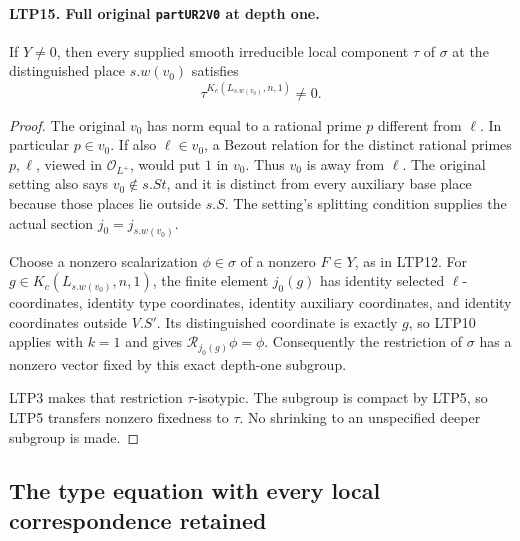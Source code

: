 \documentclass[11pt,a4paper]{article}
\numberwithin{equation}{section}
\theoremstyle{remark}\newtheorem{remark}[theorem]{Remark}
\begin{document}
\paragraph{LTP15. Full original \texttt{part\allowbreak UR2V0} at depth one.}
\label{claim:LTP15}
If \(Y\ne0\), then every supplied smooth irreducible local
component \(\tau\) of \(\sigma\) at the distinguished place
\(s.w(v_0)\) satisfies
\[
                     \tau^{K_c(L_{s.w(v_0)},n,1)}\ne0 .
\]
\begin{proof}
The original \(v_0\) has norm equal to a rational prime \(p\)
different from \(\ell\).  In particular \(p\in v_0\).
If also \(\ell\in v_0\), a Bezout relation for the distinct
rational primes \(p,\ell\), viewed in \(\mathcal O_{L^+}\),
would put \(1\) in \(v_0\).  Thus \(v_0\) is away from \(\ell\).
The original setting also says \(v_0\notin s.St\), and it is
distinct from every auxiliary base place because those places
lie outside \(s.S\).  The setting's splitting condition supplies
the actual section \(j_0=j_{s.w(v_0)}\).

Choose a nonzero scalarization \(\phi\in\sigma\) of a nonzero
\(F\in Y\), as in LTP12.  For
\(g\in K_c(L_{s.w(v_0)},n,1)\), the finite element \(j_0(g)\)
has identity selected \(\ell\)-coordinates, identity type
coordinates, identity auxiliary coordinates, and identity
coordinates outside \(V.S'\).  Its distinguished coordinate is
exactly \(g\), so LTP10 applies with \(k=1\) and gives
\(\mathscr R_{j_0(g)}\phi=\phi\).  Consequently the restriction
of \(\sigma\) has a nonzero vector fixed by this exact
depth-one subgroup.

LTP3 makes that restriction \(\tau\)-isotypic.  The subgroup is
compact by LTP5, so LTP5 transfers nonzero fixedness to \(\tau\).
No shrinking to an unspecified deeper subgroup is made.
\end{proof}

\subsection{The type equation with every local correspondence retained}

\end{document}
